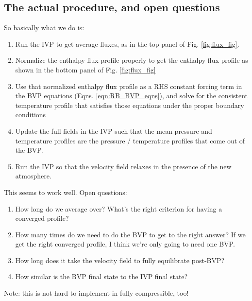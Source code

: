 \documentclass[aps, pre, onecolumn, nofootinbib, notitlepage, groupedaddress, amsfonts, amssymb, amsmath, longbibliography]{revtex4-1}
\begin{document}
\begin{enumerate}
\subsection{The actual procedure, and open questions}
So basically what we do is:
\begin{enumerate}
\item Run the IVP to get average fluxes, as in the top panel of Fig. \ref{fig:flux_fig}.
\item Normalize the enthalpy flux profile properly to get the enthalpy flux profile as shown
in the bottom panel of Fig. \ref{fig:flux_fig}
\item Use that normalized enthalpy flux profile as a RHS constant forcing term in the BVP equations
(Eqns. \ref{eqn:RB_BVP_eqns}), and solve for the consistent temperature profile that satisfies
those equations under the proper boundary conditions
\item Update the full fields in the IVP such that the mean pressure and temperature profiles are
the pressure / temperature profiles that come out of the BVP.
\item Run the IVP so that the velocity field relaxes in the presence of the new atmosphere.
\end{enumerate}

This seems to work well.  Open questions:
\begin{enumerate}
\item How long do we average over?  What's the right criterion for having a converged profile?
\item How many times do we need to do the BVP to get to the right answer?  If we get the right
converged profile, I think we're only going to need one BVP.
\item How long does it take the velocity field to fully equilibrate post-BVP?
\item How similar is the BVP final state to the IVP final state?
\end{enumerate}

Note: this is not hard to implement in fully compressible, too!




\end{enumerate}
\end{document}
